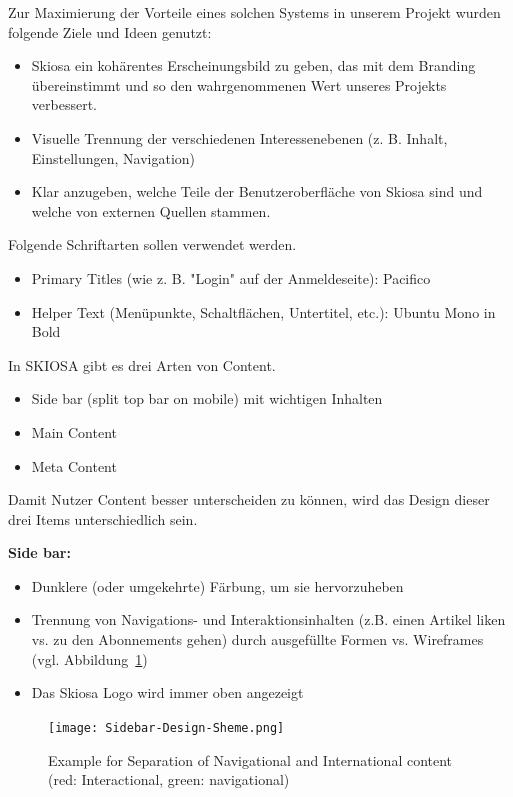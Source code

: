 Zur Maximierung der Vorteile eines solchen Systems in unserem Projekt wurden folgende Ziele und Ideen genutzt:
\begin{itemize}
    \item Skiosa ein kohärentes Erscheinungsbild zu geben, das mit dem Branding übereinstimmt und so den wahrgenommenen Wert unseres Projekts verbessert.
    \item Visuelle Trennung der verschiedenen Interessenebenen (z. B. Inhalt, Einstellungen, Navigation)
    \item Klar anzugeben, welche Teile der Benutzeroberfläche von Skiosa sind und welche von externen Quellen stammen.
\end{itemize}

Folgende Schriftarten sollen verwendet werden. 

\begin{itemize}
    \item Primary Titles (wie z. B. "Login" auf der Anmeldeseite): Pacifico
    \item Helper Text (Menüpunkte, Schaltflächen, Untertitel, etc.): Ubuntu Mono in Bold
\end{itemize}


In SKIOSA gibt es drei Arten von Content.  
\begin{itemize}
    \item Side bar (split top bar on mobile) mit wichtigen Inhalten
    \item Main Content
    \item Meta Content
\end{itemize}

Damit Nutzer Content besser unterscheiden zu können, wird das Design dieser drei Items unterschiedlich sein.

\textbf{Side bar:}
\begin{itemize}
    \item Dunklere (oder umgekehrte) Färbung, um sie hervorzuheben
    \item Trennung von Navigations- und Interaktionsinhalten (z.B. einen Artikel liken vs. zu den Abonnements gehen)  durch ausgefüllte Formen vs. Wireframes (vgl. Abbildung~\ref{fig:Sidebar-Design-Shema})
    \item Das Skiosa Logo wird immer oben angezeigt
\end{itemize}

\begin{figure}
    \texttt{[image: Sidebar-Design-Sheme.png]}
    \caption{Example for Separation of Navigational and International content (red: Interactional, green: navigational)}
    \label{fig:Sidebar-Design-Shema}
\end{figure}

